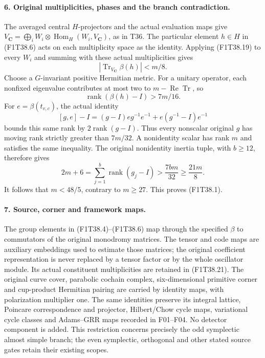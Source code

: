 \paragraph{6. Original multiplicities, phases and the branch contradiction.}
The averaged central \(H\)-projectors and the actual
evaluation maps give
\(V_{\mathbf C}=\bigoplus_i W_i\otimes
\operatorname{Hom}_H(W_i,V_{\mathbf C})\), as in T36.
The particular element \(h\in H\) in (F1T38.6) acts
on each multiplicity space as the identity. Applying
(F1T38.19) to every \(W_i\) and summing with these
actual multiplicities gives
\[
       |\operatorname{Tr}_{V_{\mathbf C}}\beta(h)|<m/8.
 \tag{F1T38.21}
\]
Choose a \(G\)-invariant positive Hermitian metric.
For a unitary operator, each nonfixed eigenvalue
contributes at most two to \(m-\operatorname{Re}\operatorname{Tr}\),
so
\[
 \operatorname{rank}(\beta(h)-I)>7m/16.
 \tag{F1T38.22}
\]
For \(e=\beta(t_{v,c})\), the actual identity
\[
 [g,e]-I=(g-I)e g^{-1}e^{-1}+e(g^{-1}-I)e^{-1}
 \tag{F1T38.23}
\]
bounds this same rank by \(2\operatorname{rank}(g-I)\).
Thus every nonscalar original \(g\) has moving rank
strictly greater than \(7m/32\). A nonidentity scalar
has rank \(m\) and satisfies the same inequality.
The original nonidentity inertia tuple, with \(b\ge12\),
therefore gives
\[
 2m+6=\sum_{j=1}^b\operatorname{rank}(g_j-I)
                  >\frac{7bm}{32}\ge\frac{21m}{8}.
 \tag{F1T38.24}
\]
It follows that \(m<48/5\), contrary to \(m\ge27\).
This proves (F1T38.1).

\paragraph{7. Source, corner and framework maps.}
The group elements in (F1T38.4)--(F1T38.6) map through
the specified \(\beta\) to commutators of the original
monodromy matrices. The tensor and code maps are
auxiliary embeddings used to estimate those matrices;
the original coefficient representation is never
replaced by a tensor factor or by the whole oscillator
module. Its actual constituent multiplicities are
retained in (F1T38.21). The original curve cover,
parabolic cochain complex, six-dimensional primitive
corner and cup-product Hermitian pairing are carried
by identity maps, with polarization multiplier one.
The same identities preserve its integral lattice,
Poincare correspondence and projector, Hilbert/Chow
cycle maps, variational cycle classes and Adams--GRR
maps recorded in F01--F04. No detector component is
added. This restriction concerns precisely the odd
symplectic almost simple branch; the even symplectic,
orthogonal and other stated source gates retain their
existing scopes.

